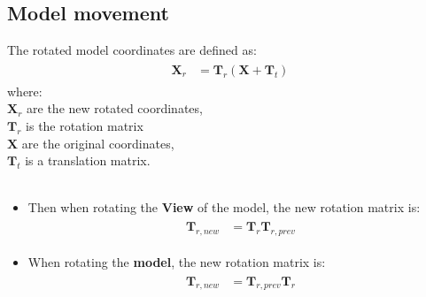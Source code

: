 \documentclass[10pt,b5paper,titlepage]{book}
\begin{document}
\subsection{Model movement}
The rotated model coordinates are defined as:
\begin{eqnarray}
    \begin{split}
        \mathbf{X}_r &= \mathbf{T}_r (\mathbf{X} + \mathbf{T}_t)
    \end{split}
\end{eqnarray}
where: \\
$ \mathbf{X}_r $ are the new rotated coordinates, \\
$ \mathbf{T}_r $ is the rotation matrix \\
$ \mathbf{X} $ are the original coordinates, \\
$ \mathbf{T}_t $ is a translation matrix. \\
\\

\begin{itemize}
    \item Then when rotating the \textbf{View} of the model, the new rotation matrix is:
        \begin{eqnarray}
            \begin{split}
                \mathbf{T}_{r,new} &= \mathbf{T}_{r} \mathbf{T}_{r,prev}
            \end{split}
        \end{eqnarray}

    \item When rotating the \textbf{model}, the new rotation matrix is:
        \begin{eqnarray}
            \begin{split}
                \mathbf{T}_{r,new} &= \mathbf{T}_{r,prev} \mathbf{T}_{r}
            \end{split}
        \end{eqnarray}
\end{itemize}
\end{document}

